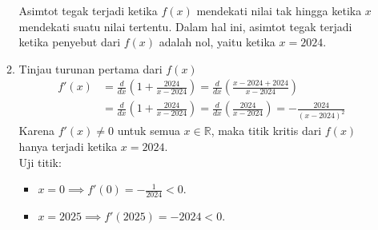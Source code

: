 \documentclass[10pt,openany,a4paper]{article}
\newcommand{\R}{\mathbb{R}}
\begin{document}
\begin{enumerate}
\begin{enumerate}
            Asimtot tegak terjadi ketika $f(x)$ mendekati nilai tak hingga ketika $x$ mendekati suatu nilai tertentu. Dalam hal ini, asimtot tegak terjadi ketika penyebut dari $f(x)$ adalah nol, yaitu ketika $x = 2024$.
            \item Tinjau turunan pertama dari $f(x)$
            \begin{align*}
                f'(x) &= \frac{d}{dx}\left(1+\frac{2024}{x-2024}\right) = \frac{d}{dx}\left(\frac{x-2024+2024}{x-2024}\right)\\
                &= \frac{d}{dx}\left(1+\frac{2024}{x-2024}\right) = \frac{d}{dx}\left(\frac{2024}{x-2024}\right) = -\frac{2024}{(x-2024)^2}
            \end{align*}
            Karena $f'(x)\neq 0$ untuk semua $x\in\R$, maka titik kritis dari $f(x)$ hanya terjadi ketika $x=2024$.\\
            Uji titik:
            \begin{itemize}
                \item $x = 0 \implies f'(0) = -\frac{1}{2024} < 0$.
                \item $x = 2025 \implies f'(2025) = -2024 < 0$.
            \end{itemize}
            \begin{center}
            \end{center}

\end{enumerate}
\end{enumerate}
\end{document}
